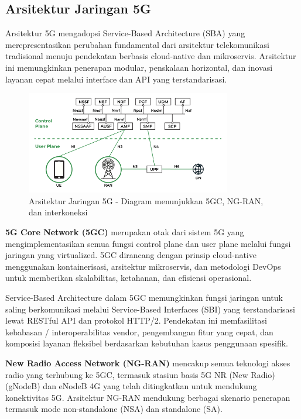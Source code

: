 \subsection{Arsitektur Jaringan 5G}

Arsitektur 5G mengadopsi Service-Based Architecture (SBA) yang merepresentasikan perubahan fundamental dari arsitektur telekomunikasi tradisional menuju pendekatan berbasis cloud-native dan mikroservis. Arsitektur ini memungkinkan penerapan modular, penskalaan horizontal, dan inovasi layanan cepat melalui interface dan API yang terstandarisasi.

\begin{figure}[htbp]
    \centering
    \includegraphics[width=0.8\textwidth]{assets/pics/bab3_7.png}
    \caption{Arsitektur Jaringan 5G - Diagram menunjukkan 5GC, NG-RAN, dan interkoneksi}
    \label{fig:5g_architecture}
\end{figure}

\textbf{5G Core Network (5GC)} merupakan otak dari sistem 5G yang mengimplementasikan semua fungsi control plane dan user plane melalui fungsi jaringan yang virtualized. 5GC dirancang dengan prinsip cloud-native menggunakan kontainerisasi, arsitektur mikroservis, dan metodologi DevOps untuk memberikan skalabilitas, ketahanan, dan efisiensi operasional.

Service-Based Architecture dalam 5GC memungkinkan fungsi jaringan untuk saling berkomunikasi melalui Service-Based Interfaces (SBI) yang terstandarisasi lewat RESTful API dan protokol HTTP/2. Pendekatan ini memfasilitasi kebabasan / interoperabilitas vendor, pengembangan fitur yang cepat, dan komposisi layanan fleksibel berdasarkan kebutuhan kasus penggunaan spesifik.

\textbf{New Radio Access Network (NG-RAN)} mencakup semua teknologi akses radio yang terhubung ke 5GC, termasuk stasiun basis 5G NR (New Radio) (gNodeB) dan eNodeB 4G yang telah ditingkatkan untuk mendukung konektivitas 5G. Arsitektur NG-RAN mendukung berbagai skenario penerapan termasuk mode non-standalone (NSA) dan standalone (SA).

